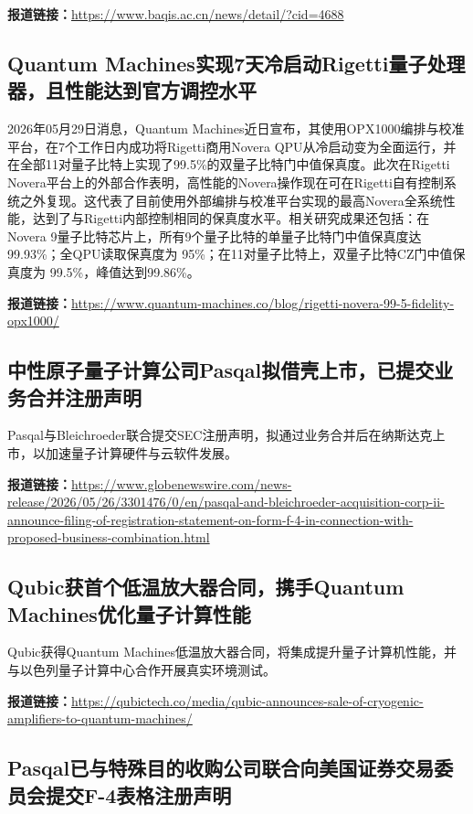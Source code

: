 \documentclass[12pt,a4paper]{ctexart}
\begin{document}
\noindent\textbf{报道链接：}\url{https://www.baqis.ac.cn/news/detail/?cid=4688}

\subsection{ Quantum Machines实现7天冷启动Rigetti量子处理器，且性能达到官方调控水平 }

2026年05月29日消息，Quantum Machines近日宣布，其使用OPX1000编排与校准平台，在7个工作日内成功将Rigetti商用Novera QPU从冷启动变为全面运行，并在全部11对量子比特上实现了99.5\%的双量子比特门中值保真度。此次在Rigetti Novera平台上的外部合作表明，高性能的Novera操作现在可在Rigetti自有控制系统之外复现。这代表了目前使用外部编排与校准平台实现的最高Novera全系统性能，达到了与Rigetti内部控制相同的保真度水平。相关研究成果还包括：在Novera 9量子比特芯片上，所有9个量子比特的单量子比特门中值保真度达99.93\%；全QPU读取保真度为 95\%；在11对量子比特上，双量子比特CZ门中值保真度为 99.5\%，峰值达到99.86\%。

\noindent\textbf{报道链接：}\url{https://www.quantum-machines.co/blog/rigetti-novera-99-5-fidelity-opx1000/}

\subsection{ 中性原子量子计算公司Pasqal拟借壳上市，已提交业务合并注册声明 }

Pasqal与Bleichroeder联合提交SEC注册声明，拟通过业务合并后在纳斯达克上市，以加速量子计算硬件与云软件发展。

\noindent\textbf{报道链接：}\url{https://www.globenewswire.com/news-release/2026/05/26/3301476/0/en/pasqal-and-bleichroeder-acquisition-corp-ii-announce-filing-of-registration-statement-on-form-f-4-in-connection-with-proposed-business-combination.html}

\subsection{ Qubic获首个低温放大器合同，携手Quantum Machines优化量子计算性能 }

Qubic获得Quantum Machines低温放大器合同，将集成提升量子计算机性能，并与以色列量子计算中心合作开展真实环境测试。

\noindent\textbf{报道链接：}\url{https://qubictech.co/media/qubic-announces-sale-of-cryogenic-amplifiers-to-quantum-machines/}

\subsection{ Pasqal已与特殊目的收购公司联合向美国证券交易委员会提交F-4表格注册声明 }
\end{document}
